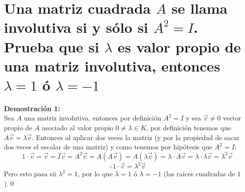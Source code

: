 \section{Una matriz cuadrada $A$ se llama involutiva si y sólo si $A^2 = I$. Prueba que si
$\lambda$ es valor propio de una matriz involutiva, 
entonces $\lambda = 1$ ó $\lambda = -1$}
\textbf{Demostraci\'on 1:}\\
Sea $A$ una matriz involutiva, entonces por definici\'on $A^2=I$ y sea $\vec{v}\neq 0$ vector propio de $A$ asociado al valor propio $0\neq \lambda\in K$, por definici\'on tenemos que $A\vec{v}=\lambda \vec{v}$. Entonces al aplicar dos veces la matriz (y por la propiedad de sacar dos veces el escalar de una matriz) y como tenemos por hip\'otesis que $A^2=I$:
\[1\cdot \vec{v}=\vec{v}= I \vec{v}=A^2\vec{v}=A(A\vec{v})=A(\lambda \vec{v})=\lambda\cdot A \vec{v}=\lambda\cdot\lambda \vec{v}=\lambda^2\vec{v}\]
\[\therefore 1\cdot\vec{v}=\lambda^2\vec{v}\]
Pero esto pasa sii $\lambda^2=1$, por lo que $\lambda=1$ \'o $\lambda=-1$ (las ra\'ices cuadradas de $1$).\qed
